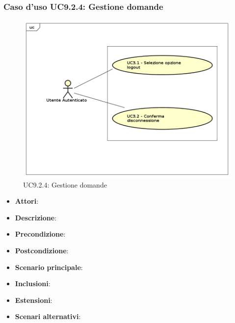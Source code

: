 		\subsubsection{Caso d'uso UC9.2.4: Gestione domande}
		\label{UC9.2.4}
		\begin{figure}[h]
			\centering
		\includegraphics[scale=0.7,keepaspectratio]{UML/UC9.png}
			\caption{UC9.2.4: Gestione domande}
		\end{figure}
		\FloatBarrier
		\begin{itemize}
			\item \textbf{Attori}: 
			\item \textbf{Descrizione}: 
			\item \textbf{Precondizione}: 
			\item \textbf{Postcondizione}: 
			\item \textbf{Scenario principale}:
			\item \textbf{Inclusioni}:
			\item \textbf{Estensioni}:
			\item \textbf{Scenari alternativi}:
		\end{itemize}
		
